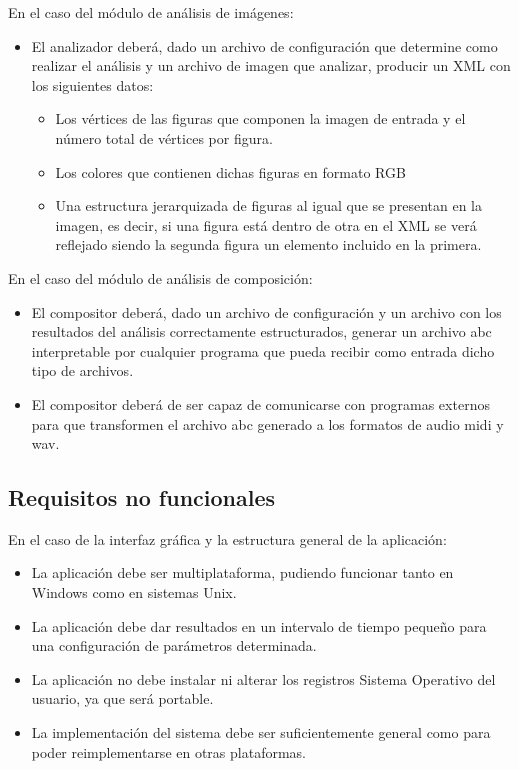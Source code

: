  En el caso del módulo de análisis de imágenes:
 \begin{itemize}
	\item El analizador deberá, dado un archivo de configuración que determine como realizar el análisis y un archivo de imagen que analizar, producir un XML con los siguientes datos:
	\begin{itemize}
		\item Los vértices de las figuras que componen la imagen de entrada y el número total de vértices por figura.
		\item Los colores que contienen dichas figuras en formato RGB
		\item Una estructura jerarquizada de figuras al igual que se presentan en la imagen, es decir, si una figura está dentro de otra en el XML se verá reflejado siendo la segunda figura un elemento incluido en la primera.
	\end{itemize}
 \end{itemize}
  En el caso del módulo de análisis de composición:
 \begin{itemize}
	\item El compositor deberá, dado un archivo de configuración y un archivo con los resultados del análisis correctamente estructurados, generar un archivo abc interpretable por cualquier programa que pueda recibir como entrada dicho tipo de archivos.
	\item El compositor deberá de ser capaz de comunicarse con programas externos para que transformen el archivo abc generado a los formatos de audio midi y wav.
 \end{itemize}
 
\subsection{Requisitos no funcionales}

En el caso de la interfaz gráfica y la estructura general de la aplicación:

\begin{itemize}
	\item La aplicación debe ser multiplataforma, pudiendo funcionar tanto en Windows como en sistemas Unix.	
	\item La aplicación debe dar resultados en un intervalo de tiempo pequeño para una configuración de parámetros determinada.
	\item La aplicación no debe instalar ni alterar los registros Sistema Operativo del usuario, ya que será portable.
	\item La implementación del sistema debe ser suficientemente general como para poder reimplementarse en otras plataformas.
\end{itemize}


